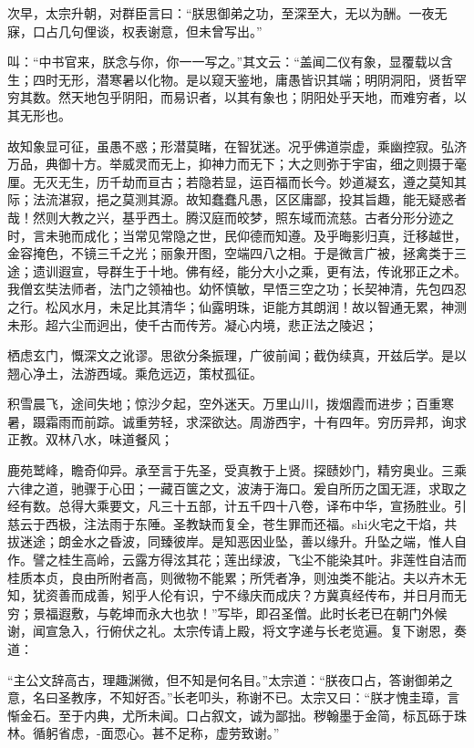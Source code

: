 \documentclass[12pt,UTF8]{ctexbook}
\begin{document}
{	次早，太宗升朝，对群臣言曰：“朕思御弟之功，至深至大，无以为酬。一夜无寐，口占几句俚谈，权表谢意，但未曾写出。”
	
	叫：“中书官来，朕念与你，你一一写之。”其文云：“盖闻二仪有象，显覆载以含生；四时无形，潜寒暑以化物。是以窥天鉴地，庸愚皆识其端；明阴洞阳，贤哲罕穷其数。然天地包乎阴阳，而易识者，以其有象也；阴阳处乎天地，而难穷者，以其无形也。
	
	故知象显可征，虽愚不惑；形潜莫睹，在智犹迷。况乎佛道崇虚，乘幽控寂。弘济万品，典御十方。举威灵而无上，抑神力而无下；大之则弥于宇宙，细之则摄于毫厘。无灭无生，历千劫而亘古；若隐若显，运百福而长今。妙道凝玄，遵之莫知其际；法流湛寂，挹之莫测其源。故知蠢蠢凡愚，区区庸鄙，投其旨趣，能无疑惑者哉！然则大教之兴，基乎西土。腾汉庭而皎梦，照东域而流慈。古者分形分迹之时，言未驰而成化；当常见常隐之世，民仰德而知遵。及乎晦影归真，迁移越世，金容掩色，不镜三千之光；丽象开图，空端四八之相。于是微言广被，拯禽类于三途；遗训遐宣，导群生于十地。佛有经，能分大小之乘，更有法，传讹邪正之术。我僧玄奘法师者，法门之领袖也。幼怀慎敏，早悟三空之功；长契神清，先包四忍之行。松风水月，未足比其清华；仙露明珠，讵能方其朗润！故以智通无累，神测未形。超六尘而迥出，使千古而传芳。凝心内境，悲正法之陵迟；
	
	栖虑玄门，慨深文之讹谬。思欲分条振理，广彼前闻；截伪续真，开兹后学。是以翘心净土，法游西域。乘危远迈，策杖孤征。
	
	积雪晨飞，途间失地；惊沙夕起，空外迷天。万里山川，拨烟霞而进步；百重寒暑，蹑霜雨而前踪。诚重劳轻，求深欲达。周游西宇，十有四年。穷历异邦，询求正教。双林八水，味道餐风；
	
	鹿苑鹫峰，瞻奇仰异。承至言于先圣，受真教于上贤。探赜妙门，精穷奥业。三乘六律之道，驰骤于心田；一藏百箧之文，波涛于海口。爰自所历之国无涯，求取之经有数。总得大乘要文，凡三十五部，计五千四十八卷，译布中华，宣扬胜业。引慈云于西极，注法雨于东陲。圣教缺而复全，苍生罪而还福。shi火宅之干焰，共拔迷途；朗金水之昏波，同臻彼岸。是知恶因业坠，善以缘升。升坠之端，惟人自作。譬之桂生高岭，云露方得泫其花；莲出绿波，飞尘不能染其叶。非莲性自洁而桂质本贞，良由所附者高，则微物不能累；所凭者净，则浊类不能沾。夫以卉木无知，犹资善而成善，矧乎人伦有识，宁不缘庆而成庆？方冀真经传布，并日月而无穷；景福遐敷，与乾坤而永大也欤！”写毕，即召圣僧。此时长老已在朝门外候谢，闻宣急入，行俯伏之礼。太宗传请上殿，将文字递与长老览遍。复下谢恩，奏道：
	
	“主公文辞高古，理趣渊微，但不知是何名目。”太宗道：“朕夜口占，答谢御弟之意，名曰圣教序，不知好否。”长老叩头，称谢不已。太宗又曰：“朕才愧圭璋，言惭金石。至于内典，尤所未闻。口占叙文，诚为鄙拙。秽翰墨于金简，标瓦砾于珠林。循躬省虑，-面恧心。甚不足称，虚劳致谢。”
	
}
\end{document}
